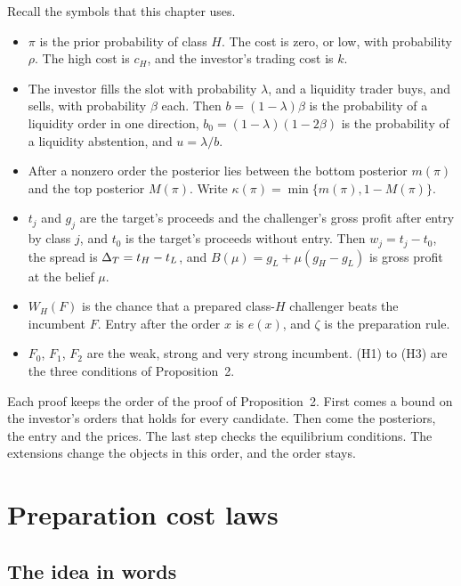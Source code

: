 Recall the symbols that this chapter uses.
\begin{itemize}
\item \(\pi\) is the prior probability of class \(H\). The cost is zero, or low, with probability \(\rho\). The high cost is \(c_H\), and the investor's trading cost is \(k\).
\item The investor fills the slot with probability \(\lambda\), and a liquidity trader buys, and sells, with probability \(\beta\) each. Then \(b=(1-\lambda)\beta\) is the probability of a liquidity order in one direction, \(b_0=(1-\lambda)(1-2\beta)\) is the probability of a liquidity abstention, and \(u=\lambda/b\).
\item After a nonzero order the posterior lies between the bottom posterior \(m(\pi)\) and the top posterior \(M(\pi)\). Write \(\kappa(\pi)=\min\{m(\pi),1-M(\pi)\}\).
\item \(t_j\) and \(g_j\) are the target's proceeds and the challenger's gross profit after entry by class \(j\), and \(t_0\) is the target's proceeds without entry. Then \(w_j=t_j-t_0\), the spread is \(\Delta_T=t_H-t_L\), and \(B(\mu)=g_L+\mu(g_H-g_L)\) is gross profit at the belief \(\mu\).
\item \(W_H(F)\) is the chance that a prepared class-\(H\) challenger beats the incumbent \(F\). Entry after the order \(x\) is \(e(x)\), and \(\zeta\) is the preparation rule.
\item \(F_0\), \(F_1\), \(F_2\) are the weak, strong and very strong incumbent. (H1) to (H3) are the three conditions of Proposition~2.
\end{itemize}

\begin{keyidea}
Each proof keeps the order of the proof of Proposition~2. First comes a bound on the investor's orders that holds for every candidate. Then come the posteriors, the entry and the prices. The last step checks the equilibrium conditions. The extensions change the objects in this order, and the order stays.
\end{keyidea}

\section{Preparation cost laws}\label{sec:robustness-costs}

\subsection{The idea in words}


